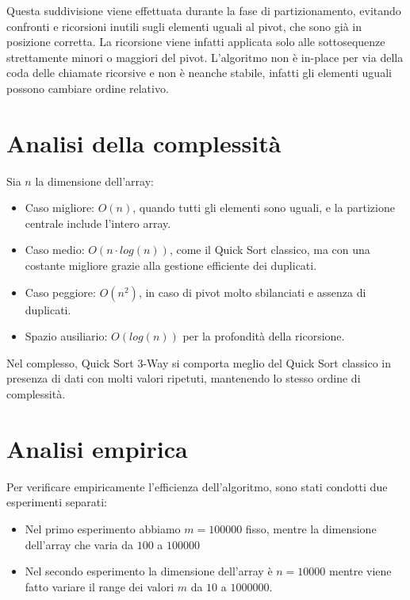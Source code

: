 \documentclass[a4paper, 12pt, oneside]{book}
\begin{document}
\noindent Questa suddivisione viene effettuata durante la fase di partizionamento, evitando confronti e ricorsioni inutili sugli elementi uguali al pivot, che sono già in posizione corretta. La ricorsione viene infatti applicata solo alle sottosequenze strettamente minori o maggiori del pivot.
L'algoritmo non è in-place per via della coda delle chiamate ricorsive e non è neanche stabile, infatti gli elementi uguali possono cambiare ordine relativo.

\section{Analisi della complessità}

Sia \(n\) la dimensione dell'array:

\begin{itemize}
    \item Caso migliore: \(O(n)\), quando tutti gli elementi sono uguali, e la partizione centrale include l'intero array.
    \item Caso medio: \(O(n \cdot log(n))\), come il Quick Sort classico, ma con una costante migliore grazie alla gestione efficiente dei duplicati.
    \item Caso peggiore: \(O(n^2)\), in caso di pivot molto sbilanciati e assenza di duplicati.
    \item Spazio ausiliario: \(O(log(n))\) per la profondità della ricorsione.
\end{itemize}

\noindent Nel complesso, Quick Sort 3-Way si comporta meglio del Quick Sort classico in presenza di dati con molti valori ripetuti, mantenendo lo stesso ordine di complessità.

\section{Analisi empirica}

Per verificare empiricamente l'efficienza dell'algoritmo, sono stati condotti due esperimenti separati:

\begin{itemize}
    \item Nel primo esperimento abbiamo \(m = 100000\) fisso, mentre la dimensione dell'array che varia da \(100\) a $100000$
    \item Nel secondo esperimento la dimensione dell'array è \(n = 10000\) mentre viene fatto variare il range dei valori \(m\) da $10$ a $1000000$.
\end{itemize}
\end{document}
